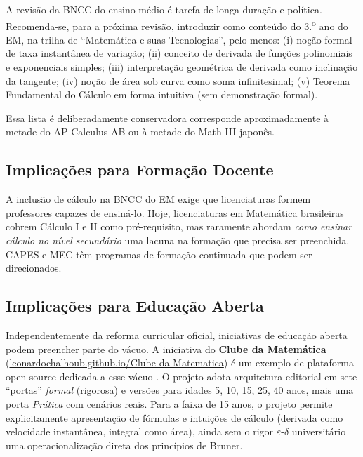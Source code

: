 \documentclass[12pt,a4paper,oneside]{article}
\begin{document}
A revisão da BNCC do ensino médio é tarefa de longa duração e
política. Recomenda-se, para a próxima revisão, introduzir como
conteúdo do 3.\textsuperscript{o} ano do EM, na trilha de
``Matemática e suas Tecnologias'', pelo menos: (i) noção formal de
taxa instantânea de variação; (ii) conceito de derivada de funções
polinomiais e exponenciais simples; (iii) interpretação geométrica
de derivada como inclinação da tangente; (iv) noção de área sob
curva como soma infinitesimal; (v) Teorema Fundamental do Cálculo
em forma intuitiva (sem demonstração formal).

Essa lista é deliberadamente conservadora \textemdash{} corresponde
aproximadamente à metade do AP Calculus AB ou à metade do Math III
japonês.

\subsection{Implicações para Formação Docente}

A inclusão de cálculo na BNCC do EM exige que licenciaturas formem
professores capazes de ensiná-lo. Hoje, licenciaturas em Matemática
brasileiras cobrem Cálculo I e II como pré-requisito, mas raramente
abordam \emph{como ensinar cálculo no nível secundário}
\textemdash{} uma lacuna na formação que precisa ser preenchida.
CAPES e MEC têm programas de formação continuada que podem ser
direcionados.

\subsection{Implicações para Educação Aberta}

Independentemente da reforma curricular oficial, iniciativas de
educação aberta podem preencher parte do vácuo. A iniciativa do
\textbf{Clube da Matemática} (\url{leonardochalhoub.github.io/Clube-da-Matematica})
é um exemplo de plataforma open source dedicada a esse vácuo
\cite{ref:clube-matematica}. O projeto adota arquitetura editorial
em sete ``portas'' \textemdash{} \emph{formal} (rigorosa) e versões
para idades 5, 10, 15, 25, 40 anos, mais uma porta \emph{Prática}
com cenários reais. Para a faixa de 15 anos, o projeto permite
explicitamente apresentação de fórmulas e intuições de cálculo
(derivada como velocidade instantânea, integral como área), ainda
sem o rigor $\varepsilon$-$\delta$ universitário \textemdash{} uma
operacionalização direta dos princípios de Bruner.

\end{document}
